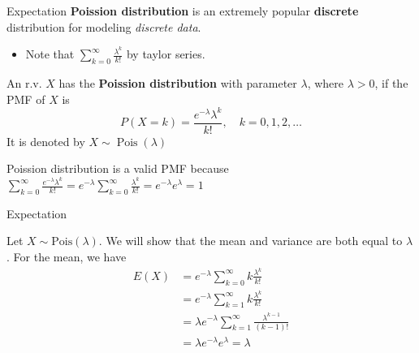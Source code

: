 \documentclass[8pt]{beamer}
\newcommand{\tb}[1]{\textbf{#1}}
\newcommand{\ti}[1]{\textit{#1}}
\newcommand{\mypois}[1]{\operatorname{Pois}(#1)}
\begin{document}
\begin{frame}{Expectation}
    \tb{Poission distribution} is an extremely popular \tb{discrete} distribution for modeling \ti{discrete data}.
    \begin{itemize}
        \item Note that $\sum^\infty_{k=0} \frac{\lambda^k}{k!}$ by taylor series.
    \end{itemize}
    \begin{definition}
        An r.v. $X$ has the \tb{Poission distribution} with parameter $\lambda$, where
        $\lambda > 0$, if the PMF of $X$ is
        \[P(X=k)=\frac{e^{-\lambda}\lambda^k}{k!},\quad k=0,1,2,\dots\]
        It is denoted by $X \sim \mypois{\lambda}$
    \end{definition}
    Poission distribution is a valid PMF because $\sum^\infty_{k=0} \frac{e^{-\lambda}\lambda^k}{k!} = e^{-\lambda} \sum^\infty_{k=0} \frac{\lambda^k}{k!} = e^{-\lambda}e^{\lambda} = 1$
\end{frame}

\begin{frame}{Expectation}
    \begin{example}
        Let $X \sim \text{Pois}(\lambda)$. We will show that the mean and variance are both equal to $\lambda$. For the mean, we have 
        \[
        \begin{aligned}
            E(X) &= e^{-\lambda} \sum^\infty_{k=0} k \frac{\lambda^k}{k!} \\
            &= e^{-\lambda} \sum^\infty_{k=1} k\frac{\lambda^k}{k!} \\
            &= \lambda e^{-\lambda} \sum^\infty_{k=1} \frac{\lambda^{k-1}}{(k-1)!} \\
            &= \lambda e^{-\lambda} e^{\lambda} = \lambda
        \end{aligned}
        \]
    \end{example}
\end{frame}
\end{document}
